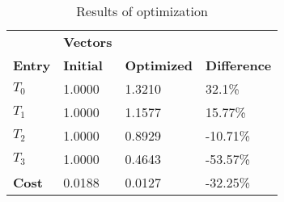\begin{table}[h!]
\centering
\begin{tabular}{llll}
\textbf{}      & \cellcolor[HTML]{EFEFEF}\textbf{Vectors} & \textbf{} & \textbf{}         \\
\rowcolor[HTML]{EFEFEF} 
\textbf{Entry} & \textbf{Initial} & \textbf{Optimized} & \textbf{Difference} \\
$T_0$ & 1.0000 & 1.3210 & 32.1\% \\ 
$T_1$ & 1.0000 & 1.1577 & 15.77\% \\ 
$T_2$ & 1.0000 & 0.8929 & -10.71\% \\ 
$T_3$ & 1.0000 & 0.4643 & -53.57\% \\ 
\rowcolor[HTML]{EFEFEF} 
\textbf{Cost}  & 0.0188 & 0.0127 & -32.25\% \\ 
\end{tabular}
\caption{Results of optimization}
\label{tab:OptimizationAnalysis}
\end{table}